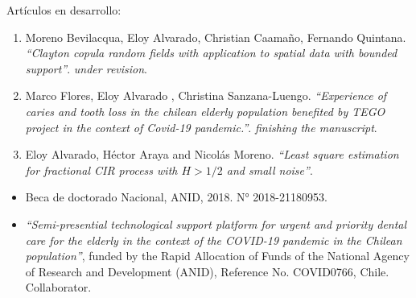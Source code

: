 \documentclass[10pt,a4paper]{article}
\begin{document}

\headedsubsection 
{Artículos en desarrollo:}{}
{\begin{enumerate}
\item Moreno Bevilacqua, Eloy Alvarado, Christian Caamaño, Fernando Quintana. \textit{``Clayton copula random fields with application to spatial data with bounded support''}. \textit{under revision}.
\item Marco Flores, Eloy Alvarado , Christina Sanzana-Luengo. \textit{``Experience of caries and tooth loss in the chilean elderly population benefited by TEGO project in the context of Covid-19 pandemic.''}. \textit{finishing the manuscript}.
\item Eloy Alvarado, Héctor Araya and Nicolás Moreno. \textit{``Least square estimation for fractional CIR process with $H>1/2$ and small noise''}.
\end{enumerate}
}

\begin{itemize}
\item Beca de doctorado Nacional, ANID, 2018. N° 2018-21180953.
\item \textit{``Semi-presential technological support platform for urgent and
priority dental care for the elderly in the context of the COVID-19 pandemic in the Chilean population''}, funded by the Rapid Allocation of Funds of the National Agency of Research and
Development (ANID), Reference No. COVID0766, Chile. Collaborator.
\end{itemize}
\end{document}
